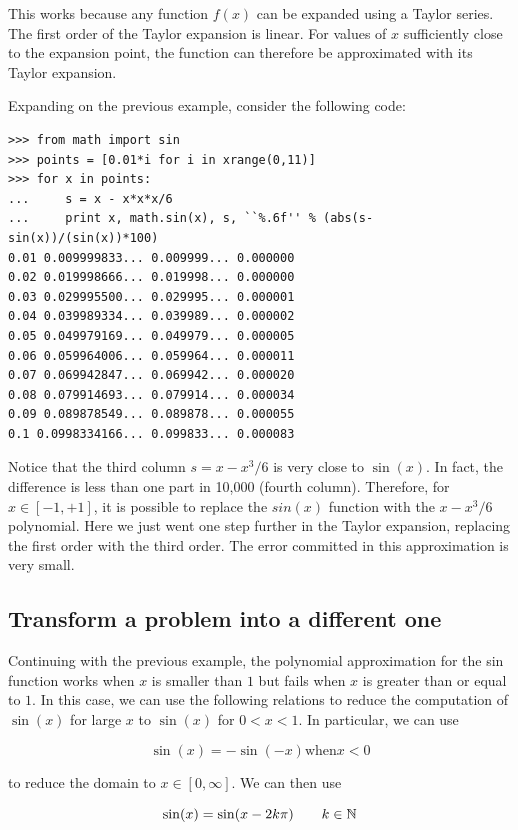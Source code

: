 \documentclass[justified,sixbynine]{tufte-book}
\theoremstyle{plain}%
\theoremstyle{definition}
\theoremstyle{remark}
\begin{document}
\begin{fullwidth}
This works because any function $f(x)$ can be expanded using a Taylor series. The first order of the Taylor expansion is linear. For values of $x$ sufficiently close to the expansion point, the function can therefore be approximated with its Taylor expansion.

Expanding on the previous example, consider the following code:

\begin{lstlisting}
>>> from math import sin
>>> points = [0.01*i for i in xrange(0,11)]
>>> for x in points:
...     s = x - x*x*x/6
...     print x, math.sin(x), s, ``%.6f'' % (abs(s-sin(x))/(sin(x))*100)
0.01 0.009999833... 0.009999... 0.000000
0.02 0.019998666... 0.019998... 0.000000
0.03 0.029995500... 0.029995... 0.000001
0.04 0.039989334... 0.039989... 0.000002
0.05 0.049979169... 0.049979... 0.000005
0.06 0.059964006... 0.059964... 0.000011
0.07 0.069942847... 0.069942... 0.000020
0.08 0.079914693... 0.079914... 0.000034
0.09 0.089878549... 0.089878... 0.000055
0.1 0.0998334166... 0.099833... 0.000083
\end{lstlisting}

Notice that the third column $s = x - x^3/6$ is very close to $\sin(x)$. In fact, the difference is less than one part in 10,000 (fourth column). Therefore, for $x \in [-1,+1]$, it is possible to replace the $sin(x)$ function with the $x-x^3/6$ polynomial. Here we just went one step further in the Taylor expansion, replacing the first order with the third order. The error committed in this approximation is very small.


\goodbreak\subsection{Transform a problem into a different one}

Continuing with the previous example, the polynomial approximation for the sin function works when $x$ is smaller than $1$ but fails when $x$ is greater than or equal to $1$. In this case, we can use the following relations to reduce the computation of $\sin(x)$ for large $x$ to $\sin(x)$ for $0<x<1$. In particular, we can use

\begin{equation}
\sin(x) = -\sin(-x) \textrm{when} x < 0
\end{equation}

to reduce the domain to $x \in [0,\infty]$. We can then use

\begin{equation}
\sin(x) = \sin(x - 2k\pi) \qquad k\in {\Bbb N}
\end{equation}


\end{fullwidth}
\end{document}
